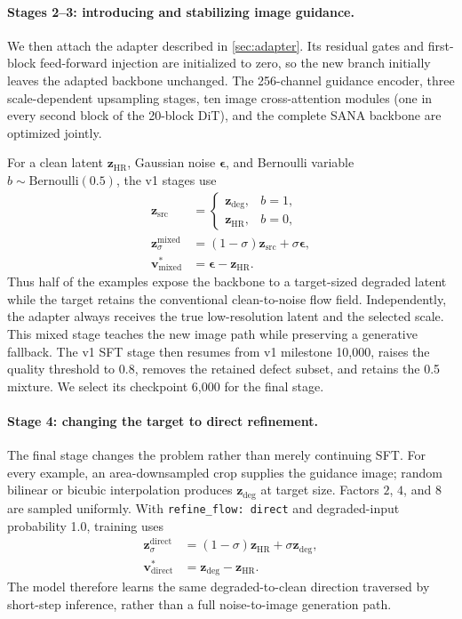 \documentclass[10pt]{article}
\begin{document}
\paragraph{Stages 2--3: introducing and stabilizing image guidance.}
We then attach the adapter described in \cref{sec:adapter}. Its residual gates
and first-block feed-forward injection are initialized to zero, so the new
branch initially leaves the adapted backbone unchanged. The 256-channel
guidance encoder, three scale-dependent upsampling stages, ten image
cross-attention modules (one in every second block of the 20-block DiT), and
the complete SANA backbone are optimized jointly.

For a clean latent $\bm{z}_{\mathrm{HR}}$, Gaussian noise
$\bm{\epsilon}$, and Bernoulli variable $b\sim\mathrm{Bernoulli}(0.5)$, the
v1 stages use
\begin{align}
  \bm{z}_{\mathrm{src}} &=
  \begin{cases}
    \bm{z}_{\mathrm{deg}}, & b=1,\\
    \bm{z}_{\mathrm{HR}}, & b=0,
  \end{cases}\\
  \bm{z}_{\sigma}^{\mathrm{mixed}}
    &= (1-\sigma)\bm{z}_{\mathrm{src}}+\sigma\bm{\epsilon},\\
  \bm{v}^{*}_{\mathrm{mixed}}
    &= \bm{\epsilon}-\bm{z}_{\mathrm{HR}}.
\end{align}
Thus half of the examples expose the backbone to a target-sized degraded
latent while the target retains the conventional clean-to-noise flow field.
Independently, the adapter always receives the true low-resolution latent and
the selected scale. This mixed stage teaches the new image path while
preserving a generative fallback. The v1 SFT stage then resumes from v1
milestone 10,000, raises the quality threshold to 0.8, removes the retained
defect subset,
and retains the 0.5 mixture. We select its checkpoint 6,000 for the final
stage.

\paragraph{Stage 4: changing the target to direct refinement.}
The final stage changes the problem rather than merely continuing SFT.
For every example, an area-downsampled crop supplies the guidance image;
random bilinear or bicubic interpolation produces
$\bm{z}_{\mathrm{deg}}$ at target size. Factors $2$, $4$, and $8$ are sampled
uniformly. With \texttt{refine\_flow: direct} and degraded-input probability
1.0, training uses
\begin{align}
  \bm{z}_{\sigma}^{\mathrm{direct}}
    &= (1-\sigma)\bm{z}_{\mathrm{HR}}
       +\sigma\bm{z}_{\mathrm{deg}},\\
  \bm{v}^{*}_{\mathrm{direct}}
    &= \bm{z}_{\mathrm{deg}}-\bm{z}_{\mathrm{HR}}.
\end{align}
The model therefore learns the same degraded-to-clean direction traversed by
short-step inference, rather than a full noise-to-image generation path.
\end{document}
